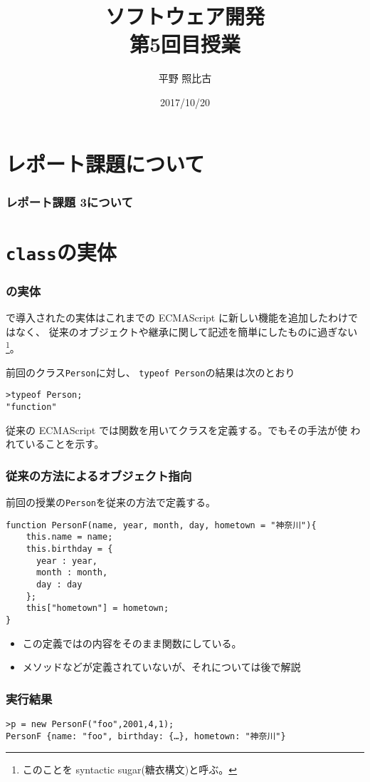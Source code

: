 %

\title{ソフトウェア開発\\第5回目授業}
\author{平野 照比古}
\institute{}
\date{2017/10/20}

\frame{\maketitle}
\section{レポート課題について}
\begin{frame}[containsverbatim]
 \frametitle{レポート課題 3について}
\end{frame}
\section{\protect\texttt{class}の実体}
\begin{frame}[containsverbatim]
\frametitle{の実体}
\ES で導入されたの実体はこれまでの
 ECMAScript に新しい機能を追加したわけではなく、
 従来のオブジェクトや継承に関して記述を簡単にしたものに過ぎない
 \footnote{このことを syntactic sugar(糖衣構文)と呼ぶ。}。
 
 前回のクラス\texttt{Person}に対し、
 \texttt{typeof Person}の結果は次のとおり
\begin{Verbatim}
>typeof Person;
"function"
\end{Verbatim}
従来の ECMAScript では関数を用いてクラスを定義する。でもその手法が使
われていることを示す。
\end{frame}
\begin{frame}[containsverbatim]
 \frametitle{従来の方法によるオブジェクト指向}
 前回の授業の\texttt{Person}を従来の方法で定義する。
 {\small
\begin{Verbatim}
function PersonF(name, year, month, day, hometown = "神奈川"){
    this.name = name;
    this.birthday = {
      year : year,
      month : month,
      day : day
    };
    this["hometown"] = hometown;
}
\end{Verbatim}
 }
 \begin{itemize}
  \item この定義ではの内容をそのまま関数にしている。
  \item メソッドなどが定義されていないが、それについては後で解説
 \end{itemize}
\end{frame}
\begin{frame}[containsverbatim]
\frametitle{実行結果}
\begin{Verbatim}
>p = new PersonF("foo",2001,4,1);
PersonF {name: "foo", birthday: {…}, hometown: "神奈川"}
\end{Verbatim}
\end{frame}
